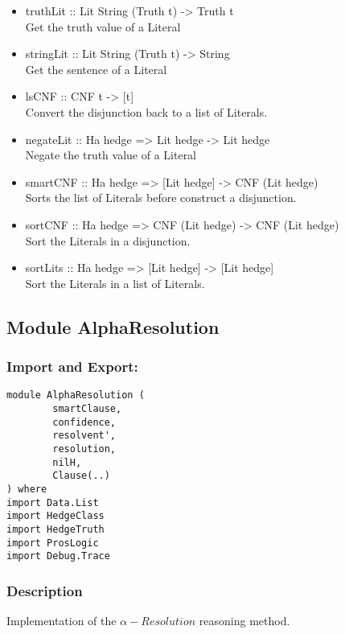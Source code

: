 \documentclass[../gr-final.tex]{subfiles}
\begin{document}
\begin{itemize}
\item truthLit :: Lit String (Truth t) -> Truth t\\
                Get the truth value of a Literal
        \item stringLit :: Lit String (Truth t) -> String\\
                Get the sentence of a Literal
        \item lsCNF :: CNF t -> [t]\\
                Convert the disjunction back to a list of
                Literals.
        \item negateLit :: Ha hedge => Lit hedge -> Lit hedge\\
                Negate the truth value of a Literal
        \item smartCNF :: Ha hedge => [Lit hedge] -> CNF (Lit
                hedge)\\
                Sorts the list of Literals before construct a
                disjunction.
        \item sortCNF :: Ha hedge => CNF (Lit hedge) -> CNF (Lit
                hedge)\\
                Sort the Literals in a disjunction.
        \item sortLits :: Ha hedge => [Lit hedge] -> [Lit
                hedge]\\
                Sort the Literals in a list of Literals.
\end{itemize}

\subsection{Module AlphaResolution}
\subsubsection{Import and Export:}
\begin{lstlisting}
module AlphaResolution (
        smartClause,
        confidence,
        resolvent',
        resolution,
        nilH,
        Clause(..)
) where
import Data.List
import HedgeClass
import HedgeTruth
import ProsLogic
import Debug.Trace
\end{lstlisting}
\subsubsection{Description}
Implementation of the $\alpha-Resolution$ reasoning method.
\end{document}

